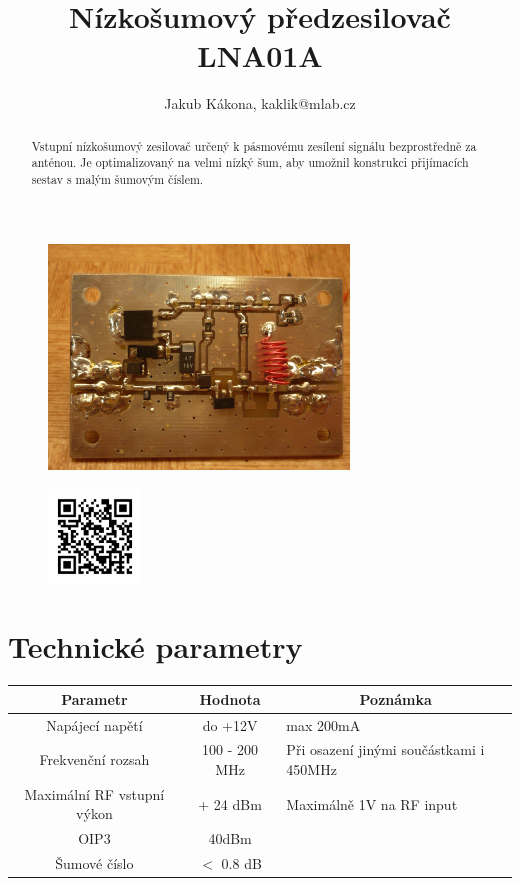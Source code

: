 \documentclass[12pt,a4paper,oneside]{article}
\begin{document}
\title{Nízkošumový předzesilovač LNA01A}
\author{Jakub Kákona, kaklik@mlab.cz}
\maketitle

\thispagestyle{empty}
\begin{abstract}
Vstupní nízkošumový zesilovač určený k pásmovému zesílení signálu bezprostředně za anténou. Je optimalizovaný na velmi nízký šum, aby umožnil konstrukci přijímacích sestav s malým šumovým číslem.  
\end{abstract}

\begin{figure} [htbp]
\begin{center}
\includegraphics [width=80mm] {./img/LNA01A_Bottom_Big.jpg} 
\end{center}
\end{figure}

\begin{figure} [b]
\includegraphics [width=25mm] {./img/LNA01A_QRcode.png} 
\end{figure}

\newpage
\tableofcontents


\section{Technické parametry}
\begin{table}[htbp]
\begin{center}
\begin{tabular}{|c|c|p{4.7cm}|}
\hline
\multicolumn{1}{|c|}{Parametr} & \multicolumn{1}{|c|}{Hodnota} & \multicolumn{1}{|c|}{Poznámka} \\ \hline
Napájecí napětí & do +12V &  max 200mA \\ \hline
Frekvenční rozsah  & 100 - 200 MHz & Při osazení jinými součástkami i 450MHz \\ \hline
Maximální RF vstupní výkon  & + 24 dBm & Maximálně 1V na RF input \\ \hline
OIP3  & 40dBm &  \\ \hline
Šumové číslo  & $<$ 0.8 dB & \\ \hline
\end{tabular}
\end{center}
\end{table}
\end{document}
